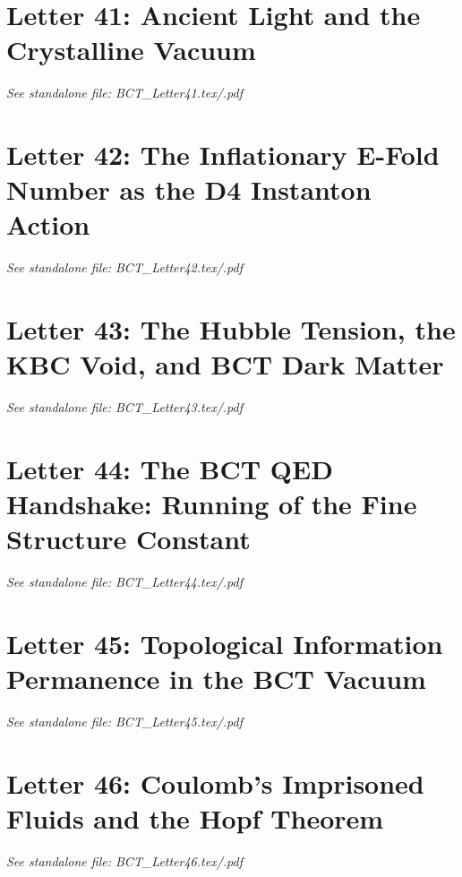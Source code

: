 \documentclass[aps,preprint,superscriptaddress,floatfix]{revtex4-2}
\begin{document}
\newpage
\section*{Letter 41: Ancient Light and the Crystalline Vacuum}
\textit{See standalone file: BCT\_Letter41.tex/.pdf}

\newpage
\section*{Letter 42: The Inflationary E-Fold Number as the D4 Instanton Action}
\textit{See standalone file: BCT\_Letter42.tex/.pdf}

\newpage
\section*{Letter 43: The Hubble Tension, the KBC Void, and BCT Dark Matter}
\textit{See standalone file: BCT\_Letter43.tex/.pdf}

\newpage
\section*{Letter 44: The BCT QED Handshake: Running of the Fine Structure Constant}
\textit{See standalone file: BCT\_Letter44.tex/.pdf}

\newpage
\section*{Letter 45: Topological Information Permanence in the BCT Vacuum}
\textit{See standalone file: BCT\_Letter45.tex/.pdf}

\newpage
\section*{Letter 46: Coulomb's Imprisoned Fluids and the Hopf Theorem}
\textit{See standalone file: BCT\_Letter46.tex/.pdf}
\end{document}
